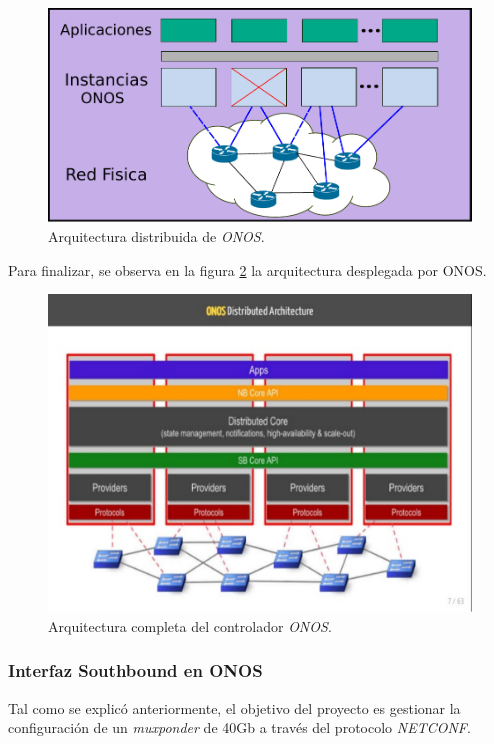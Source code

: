 \begin{figure}[H]
	\centering
	\includegraphics[scale=0.8]{Figures/onosarch.pdf}
	\caption{Arquitectura distribuida de \textit{ONOS}.}
	\label{fig:onosdistribuido}
  \end{figure}

  Para finalizar, se observa en la figura \ref{fig:onosarch} la arquitectura desplegada por ONOS.

  \begin{figure}[H]
	\centering
	\includegraphics[scale=0.7]{Figures/onosarch2.pdf}
	\caption{Arquitectura completa del controlador \textit{ONOS}.}
	\label{fig:onosarch}
  \end{figure}

  \subsubsection{Interfaz Southbound en ONOS}
  Tal como se explicó anteriormente, el objetivo del proyecto es gestionar la configuración de un \textit{muxponder} de 40Gb a través del protocolo \textit{NETCONF}. 
  
